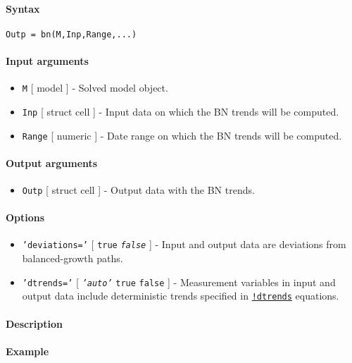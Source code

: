 


	\paragraph{Syntax}

\begin{verbatim}
Outp = bn(M,Inp,Range,...)
\end{verbatim}

\paragraph{Input arguments}

\begin{itemize}
\item
  \texttt{M} {[} model {]} - Solved model object.
\item
  \texttt{Inp} {[} struct \textbar{} cell {]} - Input data on which the
  BN trends will be computed.
\item
  \texttt{Range} {[} numeric {]} - Date range on which the BN trends
  will be computed.
\end{itemize}

\paragraph{Output arguments}

\begin{itemize}
\itemsep1pt\parskip0pt
\item
  \texttt{Outp} {[} struct \textbar{} cell {]} - Output data with the BN
  trends.
\end{itemize}

\paragraph{Options}

\begin{itemize}
\item
  \texttt{'deviations='} {[} \texttt{true} \textbar{}
  \emph{\texttt{false}} {]} - Input and output data are deviations from
  balanced-growth paths.
\item
  \texttt{'dtrends='} {[} \emph{\texttt{'auto'}} \textbar{}
  \texttt{true} \textbar{} \texttt{false} {]} - Measurement variables in
  input and output data include deterministic trends specified in
  \href{modellang/dtrends}{\texttt{!dtrends}} equations.
\end{itemize}

\paragraph{Description}

\paragraph{Example}


